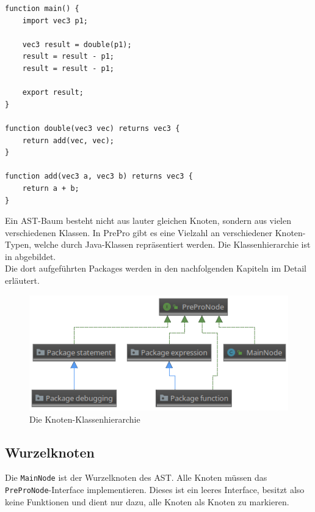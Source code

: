\begin{lstlisting}[language=prepro, label={lst:AST_Example}, caption={PrePro-Code für den beispielhaften AST}, captionpos=b]
function main() {
    import vec3 p1;

    vec3 result = double(p1);
    result = result - p1;
    result = result - p1;

    export result;
}

function double(vec3 vec) returns vec3 {
    return add(vec, vec);
}

function add(vec3 a, vec3 b) returns vec3 {
    return a + b;
}
\end{lstlisting}
Ein \ac{AST}-Baum besteht nicht aus lauter gleichen Knoten, sondern aus vielen verschiedenen Klassen.
In PrePro gibt es eine Vielzahl an verschiedener Knoten-Typen, welche durch Java-Klassen repräsentiert werden.
Die Klassenhierarchie ist in  abgebildet.\\
Die dort aufgeführten Packages werden in den nachfolgenden Kapiteln im Detail erläutert.

\begin{figure}[H]
	\centering
	\includegraphics[width=\textwidth]{figures/uml_nodes}
	\caption{Die Knoten-Klassenhierarchie}
	\label{fig:NodesHierachy}
\end{figure}

\subsection{Wurzelknoten}
Die \texttt{MainNode} ist der Wurzelknoten des \ac{AST}.
Alle Knoten müssen das \texttt{PreProNode}-Interface implementieren.
Dieses ist ein leeres Interface, besitzt also keine Funktionen und dient nur dazu, alle Knoten als Knoten zu markieren.

